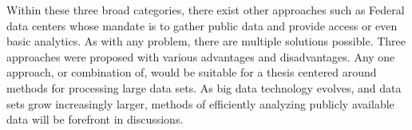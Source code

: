 Within these three broad categories, there exist other approaches such as Federal data centers whose mandate is to gather public data and provide access or even basic analytics. As with any problem, there are multiple solutions possible.  Three approaches were proposed with various advantages and disadvantages. Any one approach, or combination of, would be suitable for a thesis centered around methods for processing large data sets. As big data technology evolves, and data sets grow increasingly larger, methods of efficiently analyzing publicly available data will be forefront in discussions.